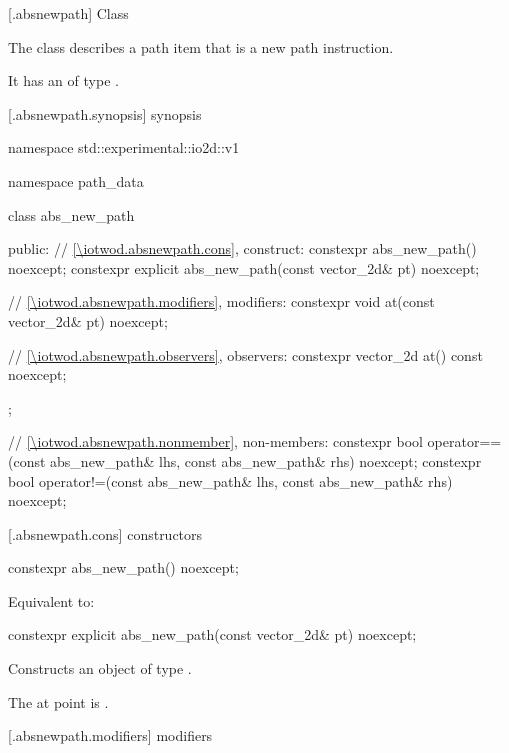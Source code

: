  [\iotwod.absnewpath] {Class }

\pnum
{}%
The class  describes a path item that is a new path instruction.

\pnum
It has an  of type .

 [\iotwod.absnewpath.synopsis] { synopsis}%

\begin{codeblock}
namespace std::experimental::io2d::v1 {
  namespace path_data {
    class abs_new_path {
    public:
      // \ref{\iotwod.absnewpath.cons}, construct:
      constexpr abs_new_path() noexcept;
      constexpr explicit abs_new_path(const vector_2d& pt) noexcept;

      // \ref{\iotwod.absnewpath.modifiers}, modifiers:
      constexpr void at(const vector_2d& pt) noexcept;

      // \ref{\iotwod.absnewpath.observers}, observers:
      constexpr vector_2d at() const noexcept;
    };
    
    // \ref{\iotwod.absnewpath.nonmember}, non-members:
    constexpr bool operator==(const abs_new_path& lhs, const abs_new_path& rhs) 
      noexcept;
    constexpr bool operator!=(const abs_new_path& lhs, const abs_new_path& rhs) 
      noexcept;
  }
}
\end{codeblock}

 [\iotwod.absnewpath.cons] { constructors}%

%
\begin{itemdecl}
constexpr abs_new_path() noexcept;
\end{itemdecl}
\begin{itemdescr}
\pnum
\effects
Equivalent to: 
\end{itemdescr}

%
\begin{itemdecl}
constexpr explicit abs_new_path(const vector_2d& pt) noexcept;
\end{itemdecl}
\begin{itemdescr}
\pnum
\effects
Constructs an object of type .

\pnum
The at point is .
\end{itemdescr}

 [\iotwod.absnewpath.modifiers]{ modifiers}%

